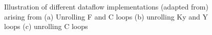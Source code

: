 \begin{figure}
    \centering
    \hspace{0.1cm} 
    \hspace{0.1cm} 
    \hspace{0.1cm} 
    \caption{Illustration of different dataflow implementations (adapted
    from\cite{dnn_df_overrated}) arising from (a) Unrolling F and C loops (b)
    unrolling Ky and Y loops (c) unrolling C loops}
    \label{fig:unroll_illustration}
\end{figure}


